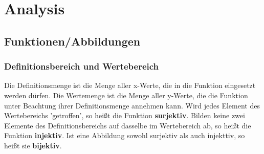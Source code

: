 \documentclass[letterpaper, titlepage]{article}
\begin{document}
\section{Analysis}\label{Analysis}


\subsection{Funktionen/Abbildungen}\label{Funktionen/Abbildungen}

\subsubsection{Definitionsbereich und Wertebereich}\label{Definitionsbereich und Wertebereich}
Die Definitionsmenge ist die Menge aller x-Werte, die in die Funktion eingesetzt werden dürfen. Die Wertemenge ist die Menge aller y-Werte, die die Funktion unter Beachtung ihrer Definitionsmenge annehmen kann. Wird jedes Element des Wertebereichs 'getroffen', so heißt die Funktion \textbf{surjektiv}. Bilden keine zwei Elemente des Definitionsbereichs auf dasselbe im Wertebereich ab, so heißt die Funktion \textbf{injektiv}. Ist eine Abbildung sowohl surjektiv als auch injekttiv, so heißt sie \textbf{bijektiv}.
\end{document}
